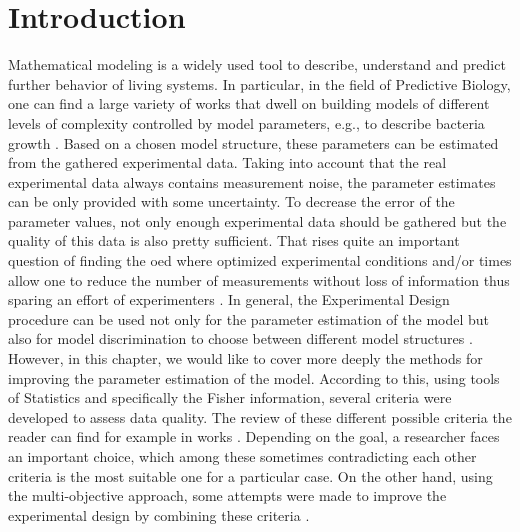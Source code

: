 \documentclass[10pt,A4paper]{article}
\begin{document}
\section*{Introduction}
%
Mathematical modeling is a widely used tool to describe, understand and predict further behavior of living systems.
In particular, in the field of Predictive Biology, one can find a large variety of works that dwell on building models of different levels of complexity controlled by model parameters, e.g., to describe bacteria growth \cite{bernaertsConceptsToolsPredictive2004}.
Based on a chosen model structure, these parameters can be estimated from the gathered experimental data.
Taking into account that the real experimental data always contains measurement noise, the parameter estimates can be only provided with some uncertainty. 
To decrease the error of the parameter values, not only enough experimental data should be gathered but the quality of this data is also pretty sufficient.
That rises quite an important question of finding the \ac{oed} where optimized experimental conditions and/or times allow one to reduce the number of measurements without loss of information thus sparing an effort of experimenters \cite{derlindenImpactExperimentDesign2013, balsa-cantoe.bangaj.r.COMPUTINGOPTIMALDYNAMIC2008}. 
In general, the Experimental Design procedure can be used not only for the parameter estimation of the model but also for model discrimination to choose between different model structures \cite{kreutzSystemsBiology2009, stamatiOptimalExperimentalDesign2016}.
However, in this chapter, we would like to cover more deeply the methods for improving the parameter estimation of the model.
According to this, using tools of Statistics and specifically the Fisher information, several criteria were developed to assess data quality. 
The review of these different possible criteria the reader can find for example in works \cite{atkinsonDevelopmentsDesignExperiments1982, franceschiniModelbasedDesignExperiments2008}.
Depending on the goal, a researcher faces an important choice, which among these sometimes contradicting each other criteria is the most suitable one for a particular case.
On the other hand, using the multi-objective approach, some attempts were made to improve the experimental design by combining these criteria \cite{telenOptimalExperimentDesign2012, logistRobustMultiobjectiveOptimal2011}.
\end{document}
